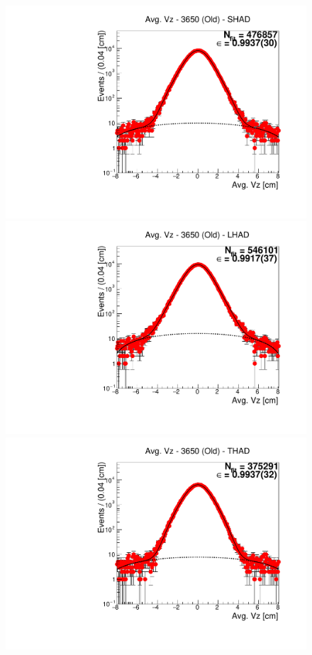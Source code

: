 \begin{figure}[H]
\centering
\includegraphics[scale=0.25]{figures/plots/nonDDbar_fit_results/3650_old/fit_old_3650_data_SHAD.pdf}
\hspace{-0.5cm}
\includegraphics[scale=0.25]{figures/plots/nonDDbar_fit_results/3650_old/fit_old_3650_data_LHAD.pdf}
\hspace{-0.5cm}
\includegraphics[scale=0.25]{figures/plots/nonDDbar_fit_results/3650_old/fit_old_3650_data_THAD.pdf}

\end{figure}
